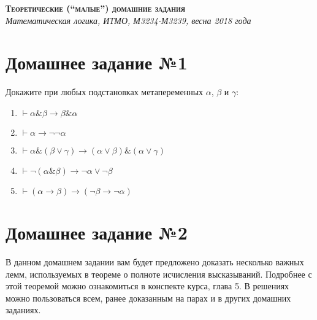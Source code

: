 \documentclass[10pt,a4paper,oneside]{article}
\begin{document}
\begin{center}{\Large\textsc{\textbf{Теоретические (``малые'') домашние задания}}}\\
             \it Математическая логика, ИТМО, М3234-М3239, весна 2018 года\end{center}

\section*{Домашнее задание №1}

Докажите при любых подстановках метапеременных $\alpha$, $\beta$ и $\gamma$:
\begin{enumerate}
\item $\vdash\alpha\&\beta\rightarrow\beta\&\alpha$
\item $\vdash\alpha \rightarrow \neg\neg \alpha$
\item $\vdash\alpha\&(\beta\vee\gamma) \rightarrow (\alpha\vee\beta)\&(\alpha\vee\gamma)$
\item $\vdash\neg(\alpha\&\beta) \rightarrow \neg\alpha\vee\neg\beta$
\item $\vdash(\alpha\rightarrow\beta)\rightarrow(\neg\beta\rightarrow\neg\alpha)$
\end{enumerate}

\section*{Домашнее задание №2}

В данном домашнем задании вам будет предложено доказать несколько
важных лемм, используемых в теореме о полноте исчисления
высказываний. Подробнее с этой теоремой можно ознакомиться в конспекте курса,
глава 5. В решениях можно пользоваться всем, ранее доказанным
на парах и в других домашних заданиях.
\end{document}
